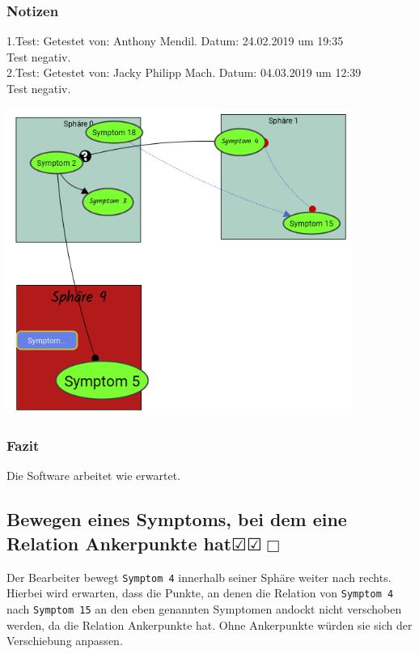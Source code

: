 \documentclass[enabledeprecatedfontcommands]{scrartcl}
\newcommand{\subsectiont}[2]{\subsection[#1]{#1{\normalsize\normalfont #2}}}
\newcommand{\leer}{$\Box$}
\newcommand{\ok}{$\CheckedBox$}
\begin{document}
\subsubsection{Notizen}
1.Test: Getestet von: Anthony Mendil. Datum: 24.02.2019 um 19:35 \\
Test negativ.\\
2.Test: Getestet von: Jacky Philipp Mach. Datum: 04.03.2019 um 12:39 \\
Test negativ.
\begin{center}
\includegraphics[height=10cm]{3_41.PNG}
\end{center}
\subsubsection{Fazit}
Die Software arbeitet wie erwartet.

\subsectiont{Bewegen eines Symptoms, bei dem eine \\Relation Ankerpunkte hat}{\dotfill\ok\ok\leer}
Der Bearbeiter bewegt \texttt{Symptom 4} innerhalb seiner Sphäre weiter nach rechts. Hierbei wird erwarten, dass die Punkte, an denen die Relation von \texttt{Symptom 4} nach \texttt{Symptom 15} an den eben genannten Symptomen andockt nicht verschoben werden, da die Relation Ankerpunkte hat. Ohne Ankerpunkte würden sie sich der Verschiebung anpassen. 
\end{document}
